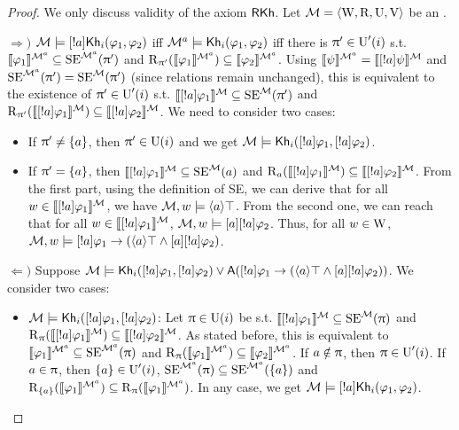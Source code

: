 \begin{proof}
We only discuss validity of the axiom $\axm{RKh}$. 
Let $\modults = \tup{\W, \R, \Unc, \V}$ be an \ults.

$\Rightarrow)$ $\modults \models \srefbox{a} \khi(\varphi_1,\varphi_2)$ iff $\modults^a \models \khi(\varphi_1,\varphi_2)$ iff there is $\plans' \in \Unc'(i)$ s.t. $\truthset{\modults^a}{\varphi_1} \subseteq \stexec^{\modults^a}(\plans')$ and $\R_{\plans'}(\truthset{\modults^a}{\varphi_1}) \subseteq \truthset{\modults^a}{\varphi_2}$.
Using $\truthset{\modults^a}{\psi} = \truthset{\modults}{\srefbox{a} \psi}$ and $\stexec^{\modults^a}(\plans') = \stexec^\modults(\plans')$ (since relations remain unchanged), this is equivalent to the existence of $\plans' \in \Unc'(i)$ s.t. $\truthset{\modults}{\srefbox{a} \varphi_1} \subseteq \stexec^\modults(\plans')$ and $\R_{\plans'}(\truthset{\modults}{\srefbox{a} \varphi_1}) \subseteq \truthset{\modults}{\srefbox{a} \varphi_2}$. We need to consider two cases:
\begin{itemize}
\item If $\plans' \neq \set{a}$, then $\plans' \in \Unc(i)$ and we get $\modults \models \khi(\srefbox{a}\varphi_1,\srefbox{a}\varphi_2)$.
\item If $\plans' = \set{a}$, then $\truthset{\modults}{\srefbox{a}\varphi_1} \subseteq \stexec^\modults(a)$ and $\R_a(\truthset{\modults}{\srefbox{a}\varphi_1}) \subseteq \truthset{\modults}{\srefbox{a}\varphi_2}$.
From the first part, using the definition of SE, we can derive that for all $w \in \truthset{\modults}{\srefbox{a}\varphi_1}$, we have $\modults,w \models \mldiam{a}\top$.
From the second one, we can reach that for all $w \in \truthset{\modults}{\srefbox{a}\varphi_1}$, $\modults,w \models \mlbox{a} \srefbox{a}\varphi_2$.
Thus, for all $w \in \W$, $\modults,w \models \srefbox{a} \varphi_1 \ra (\mldiam{a}\top \wedge \mlbox{a} \srefbox{a}\varphi_2)$.
\end{itemize}

$\Leftarrow)$ Suppose $\modults \models \khi(\srefbox{a} \varphi_1,\srefbox{a} \varphi_2) \vee \A(\srefbox{a} \varphi_1 \ra (\mldiam{a}\top \wedge \mlbox{a} \srefbox{a}\varphi_2))$. We consider two cases:
\begin{itemize}
    \item $\modults \models \khi(\srefbox{a} \varphi_1,\srefbox{a} \varphi_2)$: Let $\plans \in \Unc(i)$ be s.t. $\truthset{\modults}{\srefbox{a}\varphi_1} \subseteq \stexec^\modults(\plans)$ and $\R_\plans(\truthset{\modults}{\srefbox{a}\varphi_1}) \subseteq \truthset{\modults}{\srefbox{a}\varphi_2}$.
    As stated before, this is equivalent to $\truthset{\modults^a}{\varphi_1} \subseteq \stexec^{\modults^a}(\plans)$ and $\R_\plans(\truthset{\modults^a}{\varphi_1}) \subseteq \truthset{\modults^a}{\varphi_2}$.
    If $a \notin \plans$, then $\plans \in \Unc'(i)$.
    If $a \in \plans$, then $\set{a} \in \Unc'(i)$, $\stexec^{\modults^a}(\plans) \subseteq \stexec^{\modults^a}(\set{a})$ and $\R_{\set{a}}(\truthset{\modults^a}{\varphi_1}) \subseteq \R_\plans(\truthset{\modults^a}{\varphi_1})$. In any case, we get $\modults \models \srefbox{a}\khi(\varphi_1,\varphi_2)$.


\end{itemize}
\end{proof}
